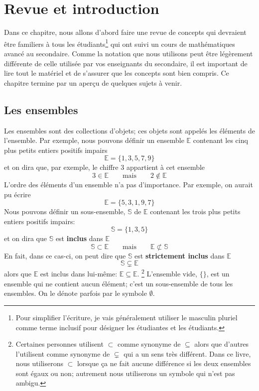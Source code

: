 
\chapter{Revue et introduction}

Dans ce chapitre, nous allons d'abord faire une revue de concepts qui devraient être familiers
à tous les étudiants\footnote{Pour simplifier l'écriture, je vais généralement utiliser le masculin pluriel comme terme inclusif pour désigner les étudiantes et les étudiants.}  qui ont suivi un cours de mathématiques avancé au secondaire.
Comme la notation que nous utilisons peut être légèrement différente de celle utilisée par vos enseignants du secondaire, il est important
de lire tout le matériel et de s'assurer que les concepts sont bien compris.  Ce chapitre termine par un aperçu de quelques sujets à venir.

\section{Les ensembles}
Les ensembles sont des collections d'objets; ces objets sont appelés les éléments de l'ensemble.  Par
exemple, nous pouvons définir un ensemble $\mathbb{E}$ contenant les cinq plus petits entiers
positifs impairs
\[
\mathbb{E} = \{ 1, 3, 5, 7, 9\}
\]
et on dira que, par exemple, le chiffre $3$ appartient à cet ensemble
\[
3 \in \mathbb{E} \qquad\mbox{mais} \qquad 2 \notin \mathbb{E}
\]
L'ordre des éléments d'un ensemble n'a pas d'importance.  Par exemple, on aurait pu écrire
\[
\mathbb{E} = \{ 5, 3, 1, 9, 7\}
\]
Nous pouvons définir un sous-ensemble, $\mathbb{S}$ de $\mathbb{E}$ contenant les trois
plus petits entiers positifs impairs:
\[
\mathbb{S} = \{1, 3, 5\}
\]
et on dira que $\mathbb{S}$ est \textbf{inclus} dans $\mathbb{E}$
\[
\mathbb{S} \subset \mathbb{E} \qquad \mbox{mais}\qquad \mathbb{E} \not \subset \mathbb{S}
\]
En fait, dans ce cas-ci, on peut dire que $\mathbb{S}$ est \textbf{strictement inclus} dans $\mathbb{E}$
\[
\mathbb{S} \subsetneq \mathbb{E}
\]
alors que $\mathbb{E}$ est inclus dans lui-même: $\mathbb{E} \subseteq \mathbb{E}$. 
\footnote{Certaines personnes utilisent $\subset$ comme synonyme de $\subseteq$ alors que d'autres
l'utilisent comme synonyme de $\subsetneq$ qui a un sens très différent.  Dans ce livre,
nous utiliserons $\subset$ lorsque ça ne fait aucune différence si les deux ensembles sont égaux ou non; autrement
nous utiliserons un symbole qui n'est pas ambigu.}
L'ensemble vide, $\{\}$, est un ensemble qui ne contient aucun élément; c'est un
sous-ensemble de tous les ensembles.  On le dénote parfois par le symbole $\emptyset$.


